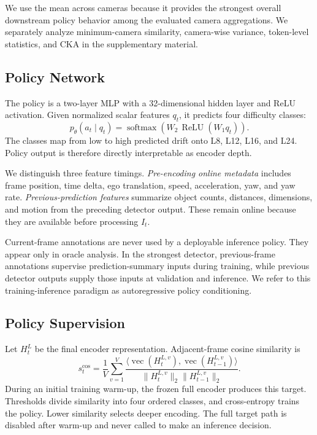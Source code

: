 \documentclass[10pt,twocolumn,letterpaper]{article}
\begin{document}
We use the mean across cameras because it provides the strongest
overall downstream policy behavior among the evaluated camera
aggregations. We separately analyze minimum-camera similarity,
camera-wise variance, token-level statistics, and CKA in the
supplementary material.





\subsection{Policy Network}

The policy is a two-layer MLP with a 32-dimensional hidden layer and ReLU activation. Given normalized scalar features $q_t$, it predicts four difficulty classes:
\begin{equation}
p_{\theta}(a_t\mid q_t)=\operatorname{softmax}(W_2\,\operatorname{ReLU}(W_1q_t)).
\end{equation}
The classes map from low to high predicted drift onto L8, L12, L16, and L24. Policy output is therefore directly interpretable as encoder depth.

We distinguish three feature timings. \emph{Pre-encoding online metadata} includes frame position, time delta, ego translation, speed, acceleration, yaw, and yaw rate. \emph{Previous-prediction features} summarize object counts, distances, dimensions, and motion from the preceding detector output. These remain online because they are available before processing $I_t$. 

Current-frame annotations are never used by a deployable inference policy. They appear only in oracle analysis. In the strongest detector, previous-frame annotations supervise prediction-summary inputs during training, while previous detector outputs supply those inputs at validation and inference. We refer to this training-inference paradigm as autoregressive policy conditioning.


\subsection{Policy Supervision} %
Let $H_t^L$ be the final encoder representation. Adjacent-frame cosine similarity is
\begin{equation}
s_t^{\mathrm{cos}}=\frac{1}{V}\sum_{v=1}^{V}
\frac{\langle \operatorname{vec}(H_t^{L,v}),\operatorname{vec}(H_{t-1}^{L,v})\rangle}
{\|H_t^{L,v}\|_2\|H_{t-1}^{L,v}\|_2}.
\end{equation}
During an initial training warm-up, the frozen full encoder produces this target. Thresholds divide similarity into four ordered classes, and cross-entropy trains the policy. Lower similarity selects deeper encoding. The full target path is disabled after warm-up and never called to make an inference decision.
\end{document}
